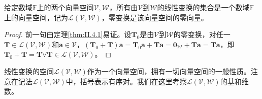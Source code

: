 \documentclass[main.tex]{subfiles}
\begin{document}
\begin{corollary}
给定数域$\mathbb{F}$上的两个向量空间$\mathcal{V},\mathcal{W}$，所有由$\mathcal{V}$到$\mathcal{W}$的线性变换的集合是一个数域$\mathbb{F}$上的向量空间，记为$\mathcal{L}\left(\mathcal{V},\mathcal{W}\right)$，零变换是该向量空间的零向量。
\end{corollary}
\begin{proof}
前一句由定理\ref{thm:II.4.1}易证。设$\mathbf{T}_0$是由$\mathcal{V}$到$\mathcal{W}$的零变换，对任一$\mathbf{T}\in\mathcal{L}\left(\mathcal{V},\mathcal{W}\right)$和$\mathbf{a}\in\mathcal{V}$，$\left(\mathbf{T}_0+\mathbf{T}\right)\mathbf{a}=\mathbf{T}_0\mathbf{a}+\mathbf{Ta}=\mathbf{0}_\mathcal{W}+\mathbf{Ta}=\mathbf{Ta}$，即$\mathbf{T}_0+\mathbf{T}=\mathbf{T}\forall\mathbf{T}\in\mathcal{L}\left(\mathcal{V},\mathcal{W}\right)$。
\end{proof}

线性变换的空间$\mathcal{L}\left(\mathcal{V},\mathcal{W}\right)$作为一个向量空间，拥有一切向量空间的一般性质。注意在记法$\mathcal{L}\left(\mathcal{V},\mathcal{W}\right)$中，括号表示有序对。我们在这里考察$\mathcal{L}\left(\mathcal{V},\mathcal{W}\right)$的基和维数。
\end{document}
